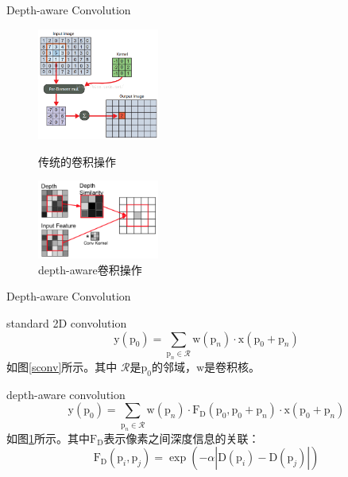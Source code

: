 \documentclass{beamer}
\begin{document}
\begin{frame}{Depth-aware Convolution}
\begin{figure}[h]
	\centering
	\begin{minipage}[t]{0.4\textwidth}
		\centering
		\includegraphics[width=4cm]{images/sconv.png}
		\caption{\label{sconv}传统的卷积操作}
	\end{minipage}
	\begin{minipage}[t]{0.4\textwidth}
		\centering
		\includegraphics[width=4cm]{images/dconv.png}
		\caption{\label{dconv}depth-aware卷积操作}
	\end{minipage}
\end{figure}
\end{frame}

\begin{frame}[<+->]{Depth-aware Convolution}

\begin{block}{standard 2D convolution}
	\begin{equation}
	\mathrm{y}(\mathrm{p}_0)=\sum_{\mathrm{p}_n\in \mathcal{R}}\mathrm{w}(\mathrm{p}_n)\cdot \mathrm{x}(\mathrm{p}_0+\mathrm{p}_n)
	\end{equation}
	如图\ref{sconv}所示。其中 $\mathcal{R}$是$\mathrm{p}_0$的邻域，$\mathrm{w}$是卷积核。
\end{block}

\begin{block}{depth-aware convolution}
	\begin{equation}
	\label{dconv:eq}
	\mathrm{y}(\mathrm{p}_0)=\sum_{\mathrm{p}_n\in \mathcal{R}}\mathrm{w}(\mathrm{p}_n)\cdot \mathrm{F_D}(\mathrm{p}_0,\mathrm{p}_0+\mathrm{p}_n)\cdot\mathrm{x}(\mathrm{p}_0+\mathrm{p}_n)
	\end{equation}
	如图\ref{dconv}所示。其中$\mathrm{F_D}$表示像素之间深度信息的关联：
	\begin{equation}
	\label{depthFunction}
	\mathrm{F_D}(\mathrm{p}_i,\mathrm{p}_j)=\exp(-\alpha|\mathrm{D}(\mathrm{p}_i)-\mathrm{D}(\mathrm{p}_j)|)
	\end{equation}
\end{block}
\end{frame}
\end{document}

